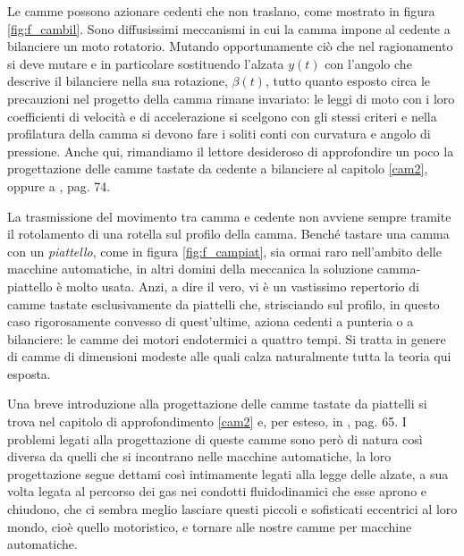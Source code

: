 \noindent Le camme possono azionare cedenti che non traslano, come mostrato
in figura \ref{fig:f_cambil}.
Sono diffusissimi meccanismi in
cui la camma impone al
cedente a bilanciere un moto rotatorio.
Mutando opportunamente
ci\`o che nel ragionamento si deve mutare e in particolare sostituendo l'alzata $y(t)$ con l'angolo
che descrive il bilanciere nella sua rotazione, $\beta(t)$, tutto quanto esposto circa le precauzioni
nel progetto della camma rimane invariato: le leggi di moto con i loro
 coefficienti di velocit\`a e di accelerazione si scelgono con gli stessi criteri e
nella profilatura della camma si devono fare i soliti conti con curvatura e angolo di 
pressione. Anche qui, rimandiamo il lettore desideroso di approfondire un poco la
progettazione delle camme tastate da cedente a bilanciere al capitolo
\ref{cam2}, oppure a \cite{ruggieri}, pag. 74.


\noindent La trasmissione del movimento tra camma e cedente non avviene sempre tramite il rotolamento
di una rotella sul profilo della camma. Bench\'e tastare una camma con un {\em piattello}, come in figura \ref{fig:f_campiat}, sia ormai raro nell'ambito delle macchine automatiche, in altri 
domini della meccanica la soluzione camma-piattello \`e molto usata.
Anzi, a dire il vero, vi \`e un vastissimo repertorio di camme tastate esclusivamente
da piattelli che, strisciando sul profilo, in questo caso
rigorosamente convesso di quest'ultime,
aziona cedenti a punteria o a bilanciere: le camme dei motori endotermici a quattro
tempi. Si tratta in genere di camme di dimensioni modeste alle quali calza naturalmente
tutta la teoria qui esposta. 

\noindent Una breve introduzione alla progettazione
delle camme tastate da piattelli si trova nel capitolo di
approfondimento \ref{cam2} e, per esteso, in \cite{ruggieri}, pag. 65.
 I problemi legati alla progettazione di queste camme
sono per\`o di natura cos\`i
diversa da quelli che si incontrano nelle macchine automatiche, la loro progettazione
segue dettami cos\`i intimamente legati alla legge delle alzate, a sua volta legata
al percorso dei gas nei condotti fluidodinamici che esse aprono e chiudono, che
ci sembra meglio lasciare questi piccoli e sofisticati eccentrici al loro
mondo, cio\`e quello motoristico, e tornare alle nostre camme per macchine
automatiche.

